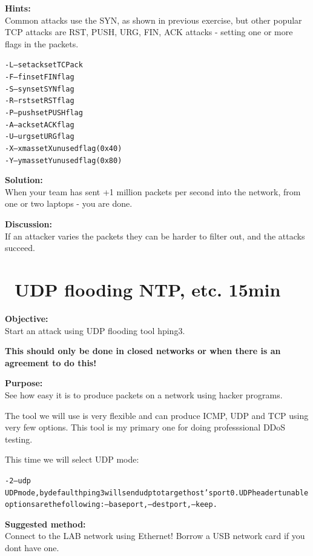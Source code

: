 \documentclass[a4paper,11pt,notitlepage]{report}
\begin{document}
{\bf Hints:}\\
Common attacks use the SYN, as shown in previous exercise, but other popular
TCP attacks are RST, PUSH, URG, FIN, ACK attacks - setting one or more flags in the packets.

\begin{alltt}
-L  --setack     set TCP ack
-F  --fin        set FIN flag
-S  --syn        set SYN flag
-R  --rst        set RST flag
-P  --push       set PUSH flag
-A  --ack        set ACK flag
-U  --urg        set URG flag
-X  --xmas       set X unused flag (0x40)
-Y  --ymas       set Y unused flag (0x80)
\end{alltt}





{\bf Solution:}\\
When your team has sent +1 million packets per second into the network, from one or two laptops - you are done.

{\bf Discussion:}\\
If an attacker varies the packets they can be harder to filter out, and the attacks succeed.

\chapter{\faInfoCircle\ UDP flooding NTP, etc. 15min}


{\bf Objective:}\\
Start an attack using UDP flooding tool hping3.

{\color{red} \bf This should only be done in closed networks or when there is an agreement to do this!}

{\bf Purpose:}\\
See how easy it is to produce packets on a network using hacker programs.

The tool we will use is very flexible and can produce ICMP, UDP and TCP using very few options. This tool is my primary one for doing professsional DDoS testing.

This time we will select UDP mode:

\begin{alltt}\footnotesize
-2 --udp
       UDP mode, by default hping3 will send udp to target host's port 0.  UDP header  tunable
       options are the following: --baseport, --destport, --keep.
\end{alltt}

{\bf Suggested method:}\\
Connect to the LAB network using Ethernet! Borrow a USB network card if you dont have one.
\end{document}
